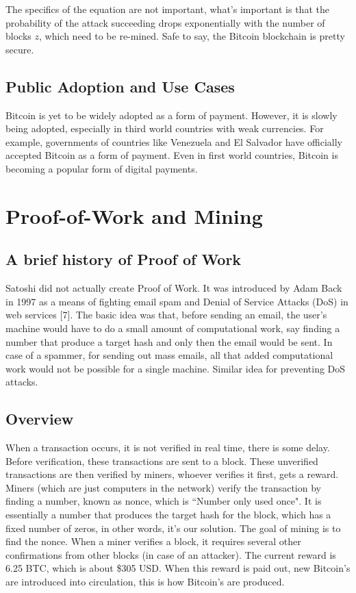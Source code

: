 \documentclass[11pt]{article} %
\begin{document}
\noindent The specifics of the equation are not important, what's important is that the probability of the attack succeeding drops exponentially with the number of blocks $z$, which need to be re-mined. Safe to say, the Bitcoin blockchain is pretty secure.

\subsection{Public Adoption and Use Cases}{}
Bitcoin is yet to be widely adopted as a form of payment. However, it is slowly being adopted, especially in third world countries with weak currencies. For example, governments of countries like Venezuela and El Salvador have officially accepted Bitcoin as a form of payment. Even in first world countries, Bitcoin is becoming a popular form of digital payments. 


\section{Proof-of-Work and Mining}{}
\subsection{A brief history of Proof of Work}
Satoshi did not actually create Proof of Work. It was introduced by Adam Back in 1997 as a means of fighting email spam and Denial of Service Attacks (DoS) in web services [7]. The basic idea was that, before sending an email, the user's machine would have to do a small amount of computational work, say finding a number that produce a target hash and only then the email would be sent. In case of a spammer, for sending out mass emails, all that added computational work would not be possible for a single machine. Similar idea for preventing DoS attacks.

\subsection{Overview}

When a transaction occurs, it is not verified in real time, there is some delay. Before verification, these transactions are sent to a block. These unverified transactions are then verified by miners, whoever verifies it first, gets a reward. Miners (which are just computers in the network) verify the transaction by finding a number, known as nonce, which is ``Number only used once". It is essentially a number that produces the target hash for the block, which has a fixed number of zeros, in other words, it's our solution. The goal of mining is to find the nonce. When a miner verifies a block, it requires several other confirmations from other blocks (in case of an attacker). The current reward is 6.25 BTC, which is about \$305 USD. When this reward is paid out, new Bitcoin's are introduced into circulation, this is how Bitcoin's are produced.
\end{document}
